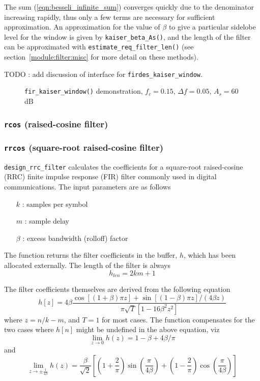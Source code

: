 The sum (\ref{eqn:besseli_infinite_sum}) converges quickly due to the
denominator increasing rapidly, thus only a few terms are necessary for
sufficient approximation.
An approximation for the value of $\beta$ to give a particular sidelobe level
for the window is given by {\tt kaiser\_beta\_As()}, and
the length of the filter can be approximated with
{\tt estimate\_req\_filter\_len()} (see section~\ref{module:filter:misc} for
more detail on these methods).

TODO : add discussion of interface for {\tt firdes\_kaiser\_window}.

\begin{figure}
\centering
{}
\caption{{\tt fir\_kaiser\_window()} demonstration, $f_c=0.15$,
$\Delta f=0.05$, $A_s=60$dB}
\label{fig:module:filter:firdes_kaiser}
\end{figure}


\subsubsection{{\tt rcos} (raised-cosine filter)}
\label{module:filter:firdes:rcos}

\subsubsection{{\tt rrcos} (square-root raised-cosine filter)}
\label{module:filter:firdes:rrcos}
{\tt design\_rrc\_filter} calculates the coefficients for a square-root
raised-cosine (RRC) finite impulse response (FIR) filter commonly used in
digital communications.
The input parameters are as follows
\begin{itemize}
    \item[$k$] : samples per symbol
    \item[$m$] : sample delay
    \item[$\beta$] : excess bandwidth (rolloff) factor
\end{itemize}
The function returns the filter coefficients in the buffer, $h$, which has been
allocated externally.  The length of the filter is always
\[
    h_{len} = 2 k m + 1
\]

The filter coefficients themselves are derived from the following equation
\[ 
    h\left[z\right] =
      4\beta \frac{ \cos\left[(1+\beta)\pi z\right] +
                    \sin\left[(1-\beta)\pi z\right] / (4\beta z) }
                  { \pi \sqrt{T}\left[ 1-16\beta^2z^2\right] }
\]
where $z=n/k-m$, and $T=1$ for most cases.
The function compensates for the two cases where $h[n]$ might be
undefined in the above equation, viz
\[
    \mathop {\lim }\limits_{z \to 0 } h(z) = 1 - \beta + 4\beta/\pi
\]
and
\[
    \mathop {\lim }\limits_{z \to \pm \frac{1}{4\beta} } h(z) =
        \frac{\beta}{\sqrt{2}}
        \left[
            \left(1 + \frac{2}{\pi}\right)\sin\left(\frac{\pi}{4\beta}\right) +
            \left(1 - \frac{2}{\pi}\right)\cos\left(\frac{\pi}{4\beta}\right)
        \right]
\]


